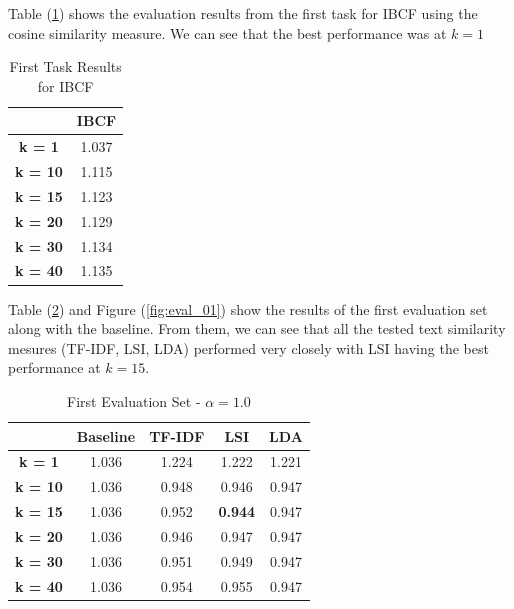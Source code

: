\documentclass{sigish}
\begin{document}
Table (\ref{tab:eval_00}) shows the evaluation results from the first task for IBCF using the cosine similarity measure. We can see that the best performance was at $ k = 1 $

\begin{table}[]
\centering
\begin{tabular}{|c|c|}
\hline
                & \textbf{IBCF} \\ \hline
\textbf{k = 1}  & 1.037         \\ \hline
\textbf{k = 10} & 1.115         \\ \hline
\textbf{k = 15} & 1.123         \\ \hline
\textbf{k = 20} & 1.129         \\ \hline
\textbf{k = 30} & 1.134         \\ \hline
\textbf{k = 40} & 1.135         \\ \hline
\end{tabular}
\caption{First Task Results for IBCF}
\label{tab:eval_00}
\end{table}

Table (\ref{tab:eval_01}) and Figure (\ref{fig:eval_01}) show the results of the first evaluation set along with the baseline. From them, we can see that all the tested text similarity mesures (TF-IDF, LSI, LDA) performed very closely with LSI having the best performance at $ k = 15 $.

\begin{table}[]
\centering
\begin{tabular}{|c|c|c|c|c|}
\hline
                & \textbf{Baseline} & \textbf{TF-IDF} & \textbf{LSI}   & \textbf{LDA} \\ \hline
\textbf{k = 1}  & 1.036             & 1.224           & 1.222          & 1.221            \\ \hline
\textbf{k = 10} & 1.036             & 0.948           & 0.946          & 0.947            \\ \hline
\textbf{k = 15} & 1.036             & 0.952           & \textbf{0.944} & 0.947            \\ \hline
\textbf{k = 20} & 1.036             & 0.946           & 0.947          & 0.947            \\ \hline
\textbf{k = 30} & 1.036             & 0.951           & 0.949          & 0.947            \\ \hline
\textbf{k = 40} & 1.036             & 0.954           & 0.955          & 0.947            \\ \hline
\end{tabular}
\caption{First Evaluation Set - $ \alpha = 1.0 $}
\label{tab:eval_01}
\end{table}
\end{document}
